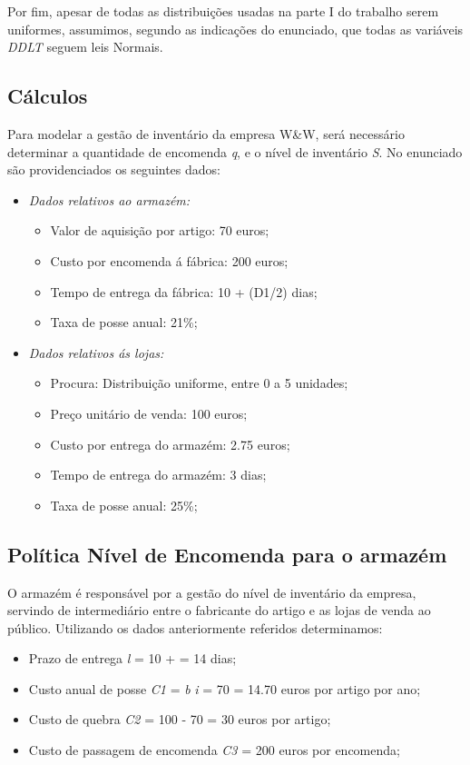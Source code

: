 Por fim, apesar de todas as distribuições usadas na parte I do trabalho serem uniformes, assumimos, segundo as indicações do enunciado, que todas as variáveis \emph{DDLT} seguem leis Normais. 


\subsection{Cálculos}

Para modelar a gestão de inventário da empresa W\&W, será necessário determinar a quantidade de encomenda \emph{q}, e o nível de inventário \emph{S}. No enunciado são providenciados os seguintes dados:

\begin{itemize}
	\item \emph{Dados relativos ao armazém:}
		\begin{itemize}
			\item Valor de aquisição por artigo: 70 euros;
			\item Custo por encomenda á fábrica: 200 euros;
			\item Tempo de entrega da fábrica: 10 + (D1/2) dias;
			\item Taxa de posse anual: 21\%;
		\end{itemize}
	\item \emph{Dados relativos ás lojas:}
		\begin{itemize}
			\item Procura: Distribuição uniforme, entre 0 a 5 unidades;
			\item Preço unitário de venda: 100 euros;
			\item Custo por entrega do armazém: 2.75 euros;
			\item Tempo de entrega do armazém: 3 dias;
			\item Taxa de posse anual: 25\%;
		\end{itemize}
\end{itemize}

\subsection{Política Nível de Encomenda para o armazém}

O armazém é responsável por a gestão do nível de inventário da empresa, servindo de intermediário entre o fabricante do artigo e as lojas de venda ao público. Utilizando os dados anteriormente referidos determinamos:

\begin{itemize}
\item Prazo de entrega \emph{l} = 10 +  = 14  dias;
\item Custo anual de posse \emph{C1} = \emph{b} \times \emph{i} = 70  = 14.70 euros por artigo por ano;
\item Custo de quebra \emph{C2} = 100 - 70 = 30 euros por artigo;
\item Custo de passagem de encomenda \emph{C3} = 200 euros por encomenda;
\end{itemize}

